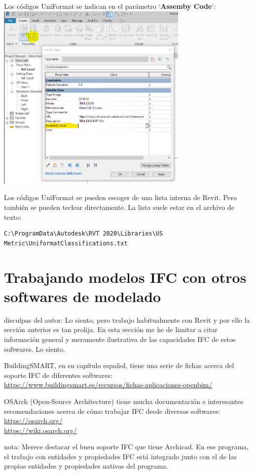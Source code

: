 \documentclass[spanish,12pt,a4paper,final,oneside]{book}
\begin{document}
Los códigos UniFormat se indican en el parámetro `\textbf{Assemby Code}':
\\ \includegraphics[width=0.7\textwidth]{parametro para el codigo UniFormat}


Los códigos UniFormat se pueden escoger de una lista interna de Revit. Pero también se pueden teclear directamente.
La lista suele estar en el archivo de texto:
\begin{verbatim}
C:\ProgramData\Autodesk\RVT 2020\Libraries\US Metric\UniformatClassifications.txt
\end{verbatim}


\section{Trabajando modelos IFC con otros softwares de modelado} \label{otros_softwares_de_modelado}
disculpas del autor: Lo siento, pero trabajo habitualmente con Revit y por ello la sección anterior es tan prolija. En esta sección me he de limitar a citar información general y meramente ilustrativa de las capacidades IFC de estos softwares. Lo siento.

BuildingSMART, en su capítulo español, tiene una serie de fichas acerca del soporte IFC de diferentes softwares: \url{https://www.buildingsmart.es/recursos/fichas-aplicaciones-openbim/}

OSArch (Open-Source Architecture) tiene mucha documentación e interesantes recomendaciones acerca de cómo trabajar IFC desde diversos softwares: \url{https://osarch.org/}
\\ \url{https://wiki.osarch.org/}

nota: Merece destacar el buen soporte IFC que tiene Archicad. En ese programa, el trabajo con entidades y propiedades IFC está integrado junto con el de las propias entidades y propiedades nativas del programa.
\end{document}
